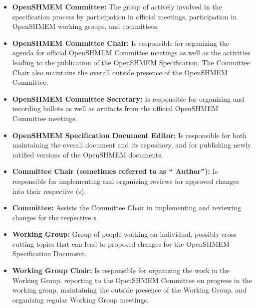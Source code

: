 \begin{itemize}
\item {\bf OpenSHMEM Committee:} The group of
  actively involved in the
  specification process by participation in official meetings,
  participation in OpenSHMEM working groups, and  committees.
\item {\bf OpenSHMEM Committee Chair:} Is responsible for organizing the agenda
  for official OpenSHMEM Committee meetings as well as the activities leading to the
  publication of the OpenSHMEM Specification. The Committee
  Chair also maintains the overall outside presence of the OpenSHMEM Committee.
\item {\bf OpenSHMEM Committee Secretary:} Is responsible for organizing and
  recording ballots as well as artifacts from the official OpenSHMEM Committee
  meetings.
\item {\bf OpenSHMEM Specification Document Editor:} Is responsible for both
  maintaining the overall document and its repository, and for
  publishing newly ratified versions of the OpenSHMEM documents.
\item {\bf {} Committee Chair (sometimes referred to as ``
  Author''):} Is responsible for implementing and organizing reviews
  for approved changes into their respective (s).
\item {\bf {} Committee:} Assists the  Committee Chair in
  implementing and reviewing changes for the respective s.
\item {\bf Working Group:} Group of people working on individual,
  possibly cross-cutting topics that can lead to proposed changes for
  the OpenSHMEM Specification Document.
\item {\bf Working Group Chair:} Is responsible for organizing the
  work in the Working Group, reporting to the OpenSHMEM Committee on progress in
  the working group, maintaining the outside presence of the Working
  Group, and organizing regular Working Group meetings.
\end{itemize}

